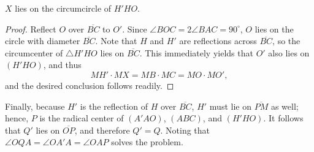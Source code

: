 \begin{claim}
    $X$ lies on the circumcircle of $H'HO$.
\end{claim}
\begin{proof}
    Reflect $O$ over $\overline{BC}$ to $O'$. Since $\angle BOC=2\angle BAC=90^\circ$, $O$ lies on the circle with diameter $\overline{BC}$. Note that $H$ and $H'$ are reflections across $\overline{BC}$, so the circumcenter of $\triangle H'HO$ lies on $\overline{BC}$. This immediately yields that $O'$ also lies on $(H'HO)$, and thus \[MH'\cdot MX=MB\cdot MC=MO\cdot MO',\]
    and the desired conclusion follows readily.
\end{proof}

Finally, because $H'$ is the reflection of $H$ over $\overline{BC}$, $H'$ must lie on $\overline{PM}$ as well; hence, $P$ is the radical center of $(A'AO)$, $(ABC)$, and $(H'HO)$. It follows that $Q'$ lies on $\overline{OP}$, and therefore $Q'=Q$. Noting that
$\angle OQA=\angle OA'A=\angle OAP$ solves the problem.
